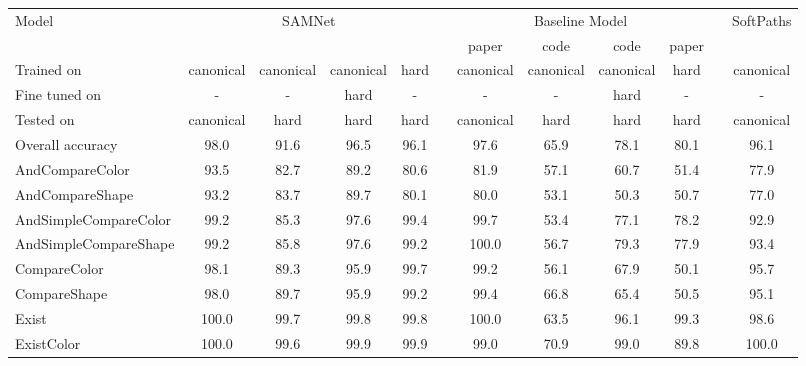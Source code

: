 \begin{table*}[htb]
	\centering
	\begin{adjustbox}{width=\columnwidth}
		\begin{tabular}{l c c c c c c c c c c c}
			\toprule
			Model & \multicolumn{4}{c}{SAMNet} &  &\multicolumn{4}{c}{Baseline Model} & & SoftPaths \\
			\cmidrule(lr){2-5} 
			\cmidrule(lr){7-10} 
			\cmidrule(lr){12-12}
			&&&&& & paper & code & code & paper\\
			\cmidrule(lr){7-10} 
			Trained on       & canonical & canonical & canonical & hard &           &  canonical  & canonical  & canonical & hard & & canonical\\ 
			Fine tuned on  & - & - & hard  & - &           & -   & - & hard & - & & -\\ 
			Tested on        & canonical & hard & hard & hard &            &canonical  & hard & hard & hard & & canonical \\ 
			\midrule			
			Overall accuracy & 98.0 & 91.6 & 96.5  & 96.1 &           & 97.6  & 65.9 & 78.1& 80.1     &   &  96.1  \\ 
			\midrule 
			AndCompareColor    &    93.5    &    82.7    &    89.2    &    80.6    &    &    81.9    &    57.1    &    60.7    &    51.4    &   &    77.9    \\
			AndCompareShape    &    93.2    &    83.7    &    89.7    &    80.1    &    &    80.0    &    53.1    &    50.3    &    50.7    &   &    77.0    \\
			AndSimpleCompareColor    &    99.2    &    85.3    &    97.6    &    99.4    &    &    99.7    &    53.4    &    77.1    &    78.2    &   &    92.9    \\
			AndSimpleCompareShape    &    99.2    &    85.8    &    97.6    &    99.2    &    &    100.0    &    56.7    &    79.3    &    77.9    &   &    93.4    \\
			CompareColor    &    98.1    &    89.3    &    95.9    &    99.7    &    &    99.2    &    56.1    &    67.9    &    50.1    &   &    95.7    \\
			CompareShape    &    98.0    &    89.7    &    95.9    &    99.2    &    &    99.4    &    66.8    &    65.4    &    50.5    &   &    95.1    \\
			Exist    &    100.0    &    99.7    &    99.8    &    99.8    &    &    100.0    &    63.5    &    96.1    &    99.3    &   &    98.6    \\
			ExistColor    &    100.0    &    99.6    &    99.9    &    99.9    &    &    99.0    &    70.9    &    99.0    &    89.8    &   &    100.0    \\

\end{tabular}
\end{adjustbox}
\end{table*}
